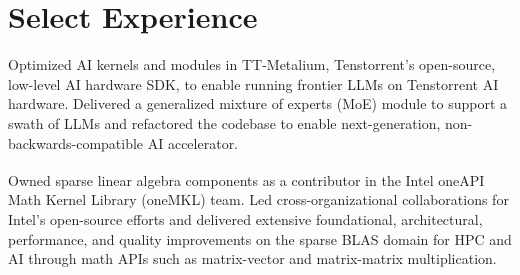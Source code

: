 \documentclass[letterpaper,10pt]{article}
\begin{document}
\vspace{-1pt}
\section{Select Experience}
  \resumeSubHeadingListStart


        \resumeItemListStart
            {Optimized AI kernels and modules in TT-Metalium\texttrademark,
            Tenstorrent's open-source, low-level AI hardware SDK, to enable
            running frontier LLMs on Tenstorrent AI hardware.}
            {Delivered a generalized mixture of experts (MoE) module to support
            a swath of LLMs and refactored the codebase to enable
            next-generation, non-backwards-compatible AI accelerator.}
        \resumeItemListEnd


        \resumeItemListStart
            {Owned sparse linear algebra components as a
            contributor in the
            Intel\textsuperscript{\scriptsize{\textregistered}} oneAPI Math
            Kernel Library (oneMKL) team.}
            {Led cross-organizational collaborations for Intel's open-source
            efforts and delivered extensive foundational, architectural,
            performance, and quality improvements on the sparse BLAS domain for
            HPC and AI through math APIs such as matrix-vector and matrix-matrix
            multiplication.}
        \resumeItemListEnd

 
\end{document}
